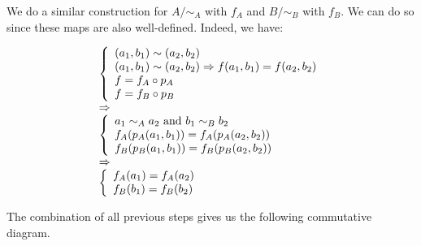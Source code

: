 \documentclass[12pt, letterpaper, twoside]{report}
\begin{document}
We do a similar construction for $A/\sim_A$ with $f_A$ and $B/\sim_B$ with $f_B$. We can do so since these maps are also well-defined. Indeed, we have:

$$
\begin{array}{l}
	\left\{
	\begin{array}{l}
		(a_1, b_1) \sim (a_2, b_2) \\
		(a_1, b_1) \sim (a_2, b_2) \Rightarrow f(a_1, b_1) = f(a_2, b_2) \\
		f = f_A \circ p_A \\
		f = f_B \circ p_B
	\end{array}
	\right.
\cr \Rightarrow \\
	\left\{
	\begin{array}{l}
		a_1 \sim_A a_2 \text{ and } b_1 \sim_B b_2 \\
		f_A(p_A(a_1, b_1)) = f_A(p_A(a_2, b_2)) \\
		f_B(p_B(a_1, b_1)) = f_B(p_B(a_2, b_2)) 
	\end{array}
	\right.
\cr \Rightarrow \\
	\left\{
	\begin{array}{l}
		f_A(a_1) = f_A(a_2) \\
		f_B(b_1) = f_B(b_2) 
	\end{array}
	\right.
\end{array}
$$

The combination of all previous steps gives us the following commutative diagram.
\end{document}
